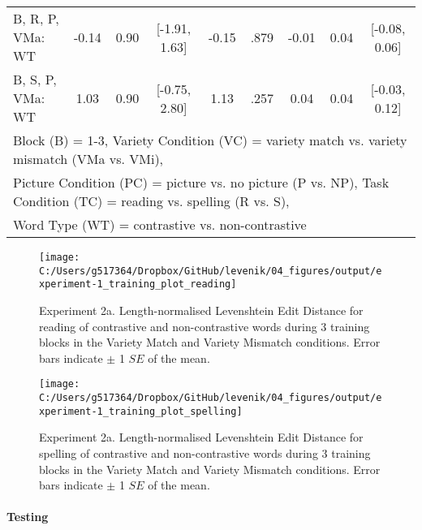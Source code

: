\documentclass[doc,floatsintext]{apa6}
\let\oldparagraph\paragraph
\renewcommand{\paragraph}[1]{\oldparagraph{#1}\mbox{}}
\begin{document}
\begin{table}[!h]
{\begin{tabular}{lcccccccc}
B, R, P, VMa: WT & -0.14 & 0.90 & [-1.91, 1.63] & -0.15 & .879 & -0.01 & 0.04 & [-0.08, 0.06]\\
B, S, P, VMa: WT & 1.03 & 0.90 & [-0.75, 2.80] & 1.13 & .257 & 0.04 & 0.04 & [-0.03, 0.12]\\
\bottomrule
\multicolumn{9}{l}{Block (B) = 1-3, Variety Condition (VC) = variety match vs. variety mismatch (VMa vs. VMi),}\\
\multicolumn{9}{l}{Picture Condition (PC) = picture vs. no picture (P vs. NP), Task Condition (TC) = reading vs. spelling (R vs. S),}\\
\multicolumn{9}{l}{Word Type (WT) = contrastive vs. non-contrastive}\\
\end{tabular}}
\end{table}

\newpage

\begin{figure}[H]

{\centering \texttt{[image: C:/Users/g517364/Dropbox/GitHub/levenik/04\_figures/output/experiment-1\_training\_plot\_reading]} 

}

\caption{Experiment 2a. Length-normalised Levenshtein Edit Distance for reading of contrastive and non-contrastive words during 3 training blocks in the Variety Match and Variety Mismatch conditions. Error bars indicate $\pm$ 1 $SE$ of the mean.}\label{fig:ex1-train-reading-plots}
\end{figure}

\begin{figure}[H]

{\centering \texttt{[image: C:/Users/g517364/Dropbox/GitHub/levenik/04\_figures/output/experiment-1\_training\_plot\_spelling]} 

}

\caption{Experiment 2a. Length-normalised Levenshtein Edit Distance for spelling of contrastive and non-contrastive words during 3 training blocks in the Variety Match and Variety Mismatch conditions. Error bars indicate $\pm$ 1 $SE$ of the mean.}\label{fig:ex1-train-spelling-plots}
\end{figure}

\paragraph{Testing}\label{testing-1}
\end{document}

